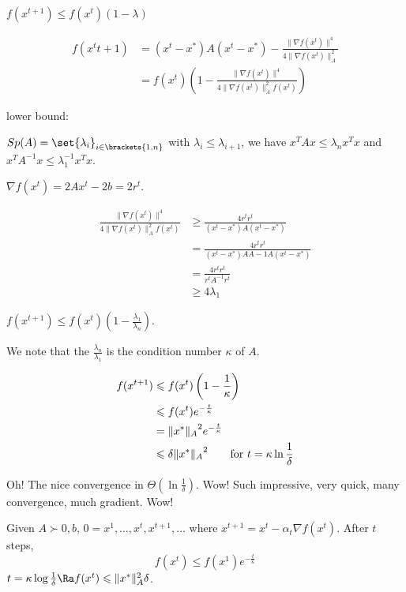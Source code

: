 $f(x^{t+1}) \leqslant f(x^t)(1-\lambda)$

\[
    \begin{aligned}
        f(x^t{t+1}) &= (x^t-x^*)A(x^t-x^*) - \frac{\lVert \nabla f(x^t) \rVert^4}{4\lVert \nabla f(x^t)\rVert_A^2}\\
        &= f(x^t) \left(1-\frac{\lVert \nabla f(x^t) \rVert^4}{4\lVert \nabla f(x^t)\rVert_A^2f(x^t)}\right)
    \end{aligned}
\]

lower bound:

$Sp(A) = \set{\lambda_i}_{i\in\brackets{1,n}}$ with $\lambda_i \leqslant \lambda_{i+1}$, we have $x^T A x \leqslant \lambda_n x^Tx$ and $x^T A^{-1} x \leqslant \lambda_1^{-1} x^Tx$.

$\nabla f(x^t) = 2Ax^t - 2b = 2r^t$.

\[
    \begin{aligned}
        \frac{\lVert \nabla f(x^t) \rVert^4}{4\lVert \nabla f(x^t)\rVert_A^2f(x^t)} &\geqslant \frac{4r^tr^t}{(x^t-x^*)A(x^t-x^*)}\\
        &=\frac{4r^tr^t}{(x^t-x^*)AA-1A(x^t-x^*)}\\
        &= \frac{4r^tr^t}{r^tA^{-1}r^t}\\
        &\geqslant 4\lambda_1
    \end{aligned}
\]

$f(x^{t+1}) \leqslant f(x^t) \left(1- \frac{\lambda_1}{\lambda_n}\right)$.

We note that the $\frac{\lambda_n}{\lambda_1}$ is the condition number $\kappa$ of $A$.

\[
    \begin{aligned}
        f(x^{t+1}) &\leqslant f(x^t) \left(1-\frac{1}{\kappa}\right)\\
        &\leqslant f(x^t) e^{-\frac{t}{\kappa}}\\
        &= {\lVert x^* \rVert_A}^2 e^{-\frac{t}{\kappa}}\\
        &\leqslant \delta {\lVert x^* \rVert_A}^2 \text{\qquad for }t = \kappa \ln \frac{1}{\delta}
    \end{aligned}
\]

Oh! The nice convergence in $\Theta\left(\ln\frac{1}{\delta}\right)$. Wow! Such impressive, very quick, many convergence, much gradient. Wow!


\begin{theorem}
    Given $A\succ 0, b$, $0=x^1,\ldots, x^t, x^{t+1},\ldots$ where $x^{t+1} = x^{t} - \alpha_t\nabla f(x^t)$. After $t$ steps,
    \[
        f(x^t) \leqslant f(x^1) e^{-\frac{t}{\kappa}}
    \]
    $t = \kappa \log \frac{1}{\delta} \Ra f(x^t) \leqslant \lVert x^* \rVert_A^2 \delta$.
\end{theorem}

